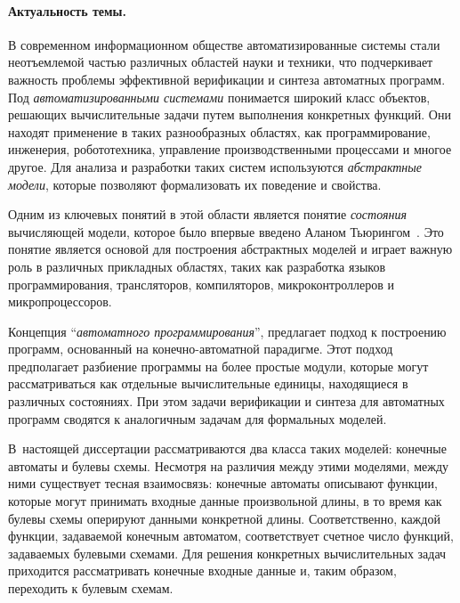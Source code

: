 %
%
\paragraph{Актуальность темы.}
%
В современном информационном обществе автоматизированные системы стали неотъемлемой частью различных областей науки и техники, что подчеркивает важность проблемы эффективной верификации и синтеза автоматных программ.
Под \textit{автоматизированными системами} понимается широкий класс объектов, решающих вычислительные задачи путем выполнения конкретных функций.
Они находят применение в таких разнообразных областях, как программирование, инженерия, робототехника, управление производственными процессами и многое другое.
Для анализа и разработки таких систем используются \textit{абстрактные модели}, которые позволяют формализовать их поведение и свойства.

Одним из ключевых понятий в этой области является понятие \textit{состояния} вычисляющей модели, которое было впервые введено Аланом Тьюрингом~\autocite{turing1937}.
Это понятие является основой для построения абстрактных моделей и играет важную роль в различных прикладных областях, таких как разработка языков программирования, трансляторов, компиляторов, микроконтроллеров и микропроцессоров.

Концепция \enquote{\textit{автоматного программирования}},  предлагает подход к построению программ, основанный на конечно-автоматной парадигме.
Этот подход предполагает разбиение программы на более простые модули, которые могут рассматриваться как отдельные вычислительные единицы, находящиеся в различных состояниях.
При этом задачи верификации и синтеза для автоматных программ сводятся к аналогичным задачам для формальных моделей.

В~настоящей диссертации рассматриваются два класса таких моделей: конечные автоматы и булевы схемы.
Несмотря на различия между этими моделями, между ними существует тесная взаимосвязь: конечные автоматы описывают функции, которые могут принимать входные данные произвольной длины, в то время как булевы схемы оперируют данными конкретной длины.
Соответственно, каждой функции, задаваемой конечным автоматом, соответствует счетное число функций, задаваемых булевыми схемами.
Для решения конкретных вычислительных задач приходится рассматривать конечные входные данные и, таким образом, переходить к булевым схемам.

